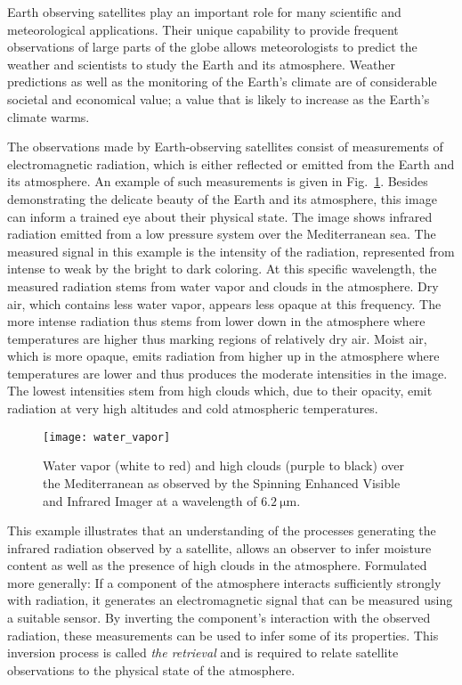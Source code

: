Earth observing satellites play an important role for many scientific and
meteorological applications. Their unique capability to provide frequent
observations of large parts of the globe allows meteorologists to predict the
weather and scientists to study the Earth and its atmosphere. Weather
predictions as well as the monitoring of the Earth's climate are of considerable
societal and economical value; a value that is likely to increase as the Earth's
climate warms.

The observations made by Earth-observing satellites consist of measurements of
electromagnetic radiation, which is either reflected or emitted from the Earth
and its atmosphere. An example of such measurements is given in
Fig.~\ref{fig:introduction:water_vapor}. Besides demonstrating the delicate
beauty of the Earth and its atmosphere, this image can inform a trained eye
about their physical state. The image shows infrared radiation emitted from a
low pressure system over the Mediterranean sea. The measured signal in this
example is the intensity of the radiation, represented from intense to weak by
the bright to dark coloring. At this specific wavelength, the measured radiation
stems from water vapor and clouds in the atmosphere. Dry air, which contains
less water vapor, appears less opaque at this frequency. The more intense
radiation thus stems from lower down in the atmosphere where temperatures are
higher thus marking regions of relatively dry air. Moist air, which is more
opaque, emits radiation from higher up in the atmosphere where temperatures are
lower and thus produces the moderate intensities in the image. The lowest
intensities stem from high clouds which, due to their opacity, emit radiation at
very high altitudes and cold atmospheric temperatures.

\begin{figure}[h!]
\centering
\texttt{[image: water\_vapor]}
\caption{Water vapor (white to red) and high clouds (purple to black) over the
Mediterranean as observed by the Spinning Enhanced Visible and Infrared
Imager at a wavelength of $\SI{6.2}{\micro \meter}$.}
\label{fig:introduction:water_vapor}
\end{figure}

This example illustrates that an understanding of the processes generating the
infrared radiation observed by a satellite, allows an observer to infer moisture
content as well as the presence of high clouds in the atmosphere. Formulated
more generally: If a component of the atmosphere interacts sufficiently strongly
with radiation, it generates an electromagnetic signal that can be measured
using a suitable sensor. By inverting the component's interaction with the
observed radiation, these measurements can be used to infer some of its
properties. This inversion process is called \textit{the retrieval} and is
required to relate satellite observations to the physical state of the
atmosphere.

